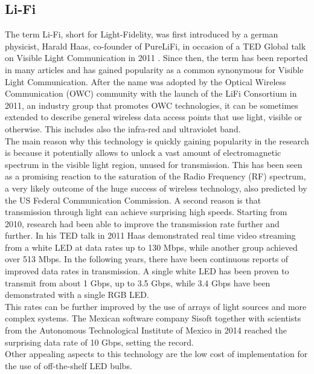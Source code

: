 \subsection{Li-Fi}
The term Li-Fi, short for Light-Fidelity, was first introduced by a german physicist, Harald Haas, co-founder of PureLiFi, in occasion of a TED Global talk on Visible Light Communication in 2011 \cite{tedtalk}.
Since then, the term has been reported in many articles and has gained popularity as a common synonymous for Visible Light Communication.
After the name was adopted by the Optical Wireless Communication (OWC) community with the launch of the LiFi Consortium in 2011, an industry group that promotes OWC technologies, it can be sometimes extended to describe general wireless data access points that use light, visible or otherwise.
This includes also the infra-red and ultraviolet band.\\
The main reason why this technology is quickly gaining popularity in the research is because it potentially allows to unlock a vast amount of electromagnetic spectrum in the visible light region, unused for transmission.\cite{haas1}
This has been seen as a promising reaction to the saturation of the Radio Frequency (RF) spectrum, a very likely outcome of the huge success of wireless technology, also predicted by the US Federal Communication Commission\cite{crisis}. 
A second reason is that transmission through light can achieve surprising high speeds.
Starting from 2010, research had been able to improve the transmission rate further and further.
In his TED talk in 2011 Haas demonstrated real time video streaming from a white LED at data rates up to 130 Mbps\cite{tedtalk}, while another group achieved over 513 Mbps\cite{500Mbps}.
In the following years, there have been continuous reports of improved data rates in transmission.
A single white LED has been proven to transmit from about 1 Gbps\cite{1Gbps}, up to 3.5 Gbps\cite{3.5Gbps}, while 3.4 Gbps have been demonstrated with a single RGB LED\cite{3.4Gbps}.\\
This rates can be further improved by the use of arrays of light sources and more complex systems.
The Mexican software company Sisoft together with scientists from the Autonomous Technological Institute of Mexico in 2014 reached the surprising data rate of 10 Gbps, setting the record.\\
Other appealing aspects to this technology are the low cost of implementation for the use of off-the-shelf LED bulbs.\\

